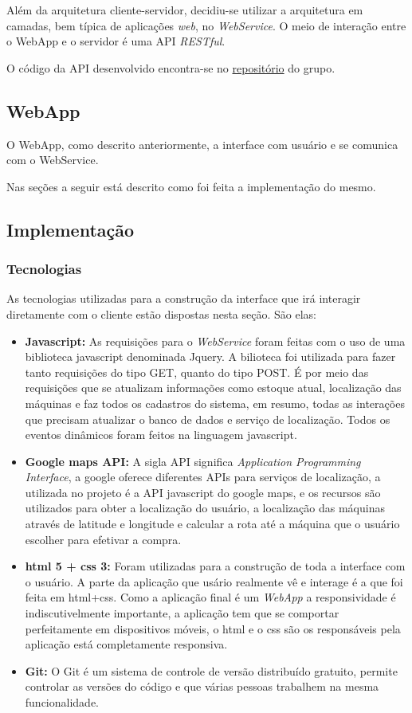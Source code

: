 Além da arquitetura cliente-servidor, decidiu-se utilizar a arquitetura em camadas, bem típica de aplicações \textit{web}, no \textit{WebService}. O meio de interação entre o WebApp e o servidor é uma API \textit{RESTful}.

O código da API desenvolvido encontra-se no \href{http://github.com/pi2-picole/api}{repositório} do grupo.


\subsection{WebApp}

O WebApp, como descrito anteriormente, a interface com usuário e se comunica com o WebService.

Nas seções a seguir está descrito como foi feita a implementação do mesmo.
\subsection{Implementação}

\subsubsection{Tecnologias}

As tecnologias utilizadas para a construção da interface que irá interagir diretamente com o cliente estão dispostas nesta seção. São elas:

\begin{itemize}
\item \textbf{Javascript:} As requisições para o \textit{WebService} foram feitas com o uso de uma biblioteca javascript denominada Jquery. A bilioteca foi utilizada para fazer tanto requisições do tipo GET, quanto do tipo POST. É por meio das requisições que se atualizam informações como estoque atual, localização das máquinas e faz todos os cadastros do sistema, em resumo, todas as interações que precisam atualizar o banco de dados e serviço de localização. Todos os eventos dinâmicos foram feitos na linguagem javascript.
\item \textbf{Google maps API:} A sigla API significa \textit{Application Programming Interface}, a google oferece diferentes APIs para serviços de localização, a utilizada no projeto é a API javascript do google maps, e os recursos são utilizados para obter a localização do usuário, a localização das máquinas através de latitude e longitude e calcular a rota até a máquina que o usuário escolher para efetivar a compra.
\item\textbf{ html 5 + css 3:} Foram utilizadas para a construção de toda a interface com o usuário. A parte da aplicação que usário realmente vê e interage é a que foi feita em html+css. Como a aplicação final é um \textit{WebApp} a responsividade é indiscutivelmente importante, a aplicação tem que se comportar perfeitamente em dispositivos móveis, o html e o css são os responsáveis pela aplicação está completamente responsiva.
\item\textbf{Git:} O Git é um sistema de controle de versão distribuído gratuito, permite controlar as versões do código e que várias pessoas trabalhem na mesma funcionalidade.
\end{itemize}

